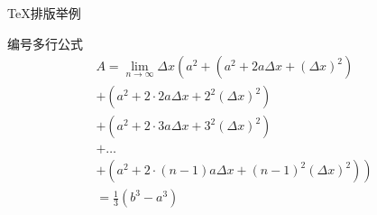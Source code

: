 \documentclass[xcolor=table,svgnames]{beamer}
\begin{document}
\begin{frame}{\TeX{}排版举例}
  \begin{exampleblock}{编号多行公式}
  \begin{multline}
    A=\lim_{n\rightarrow\infty}\Delta x\left(a^{2}+\left(a^{2}+2a\Delta x+\left(\Delta x\right)^{2}\right)\right.\label{eq:reset}\\
    +\left(a^{2}+2\cdot2a\Delta x+2^{2}\left(\Delta x\right)^{2}\right)\\
    +\left(a^{2}+2\cdot3a\Delta x+3^{2}\left(\Delta x\right)^{2}\right)\\
    +\ldots\\
    \left.+\left(a^{2}+2\cdot(n-1)a\Delta x+(n-1)^{2}\left(\Delta x\right)^{2}\right)\right)\\
    =\frac{1}{3}\left(b^{3}-a^{3}\right)
  \end{multline}
  \end{exampleblock}
\end{frame}
\end{document}
